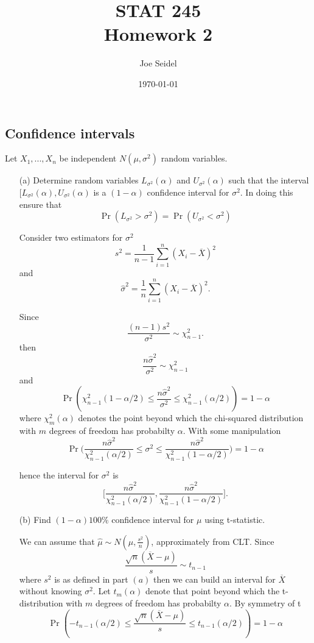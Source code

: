 \documentclass{tufte-book}
\title{STAT  245\\Homework 2}
\author{Joe Seidel}
\date{\today}
\begin{document}
\maketitle
{}
\newpage
{}

\subsection{Confidence intervals}
Let $X_1,...,X_n$ be independent $N(\mu, \sigma^2)$ random variables.

\begin{enumerate}
\item[(a)] Determine random variables $L_{\sigma^2}(\alpha)$ and $U_{\sigma^2}(\alpha)$ such that the interval $[L_{\sigma^2}(\alpha),U_{\sigma^2}(\alpha)$ is a $(1-\alpha)$ confidence interval for $\sigma^2$.  In doing this ensure that
\[ \Pr(L_{\sigma^2}>\sigma^2) = \Pr(U_{\sigma^2} < \sigma^2) \]

Consider two estimators for $\sigma^2$
\[ s^2 = \frac{1}{n-1}\sum_{i=1}^n(X_i-\overline{X})^2 \]
and
\[ \hat{\sigma}^2 = \frac{1}{n}\sum_{i=1}^n(X_i - \overline{X})^2. \]

Since
\[ \frac{(n-1)s^2}{\sigma^2} \sim \chi^2_{n-1}. \]
then
\[ \frac{n\hat{\sigma}^2}{\sigma^2} \sim \chi_{n-1}^2 \]
and
\[ \Pr(\chi_{n-1}^2(1-\alpha/2) \leq \frac{n\hat{\sigma}^2}{\sigma^2} \leq \chi_{n-1}^2(\alpha/2)) = 1-\alpha \]
where $\chi_{m}^2(\alpha)$ denotes the point beyond which the chi-squared distribution with $m$ degrees of freedom has probabilty $\alpha$.  With some manipulation
\[ \Pr\big(\frac{n\hat{\sigma}^2}{\chi_{n-1}^2(\alpha/2)}\leq \sigma^2 \leq \frac{n\hat{\sigma}^2}{\chi_{n-1}^2(1-\alpha/2)}\big) = 1-\alpha \]

hence the interval for $\sigma^2$ is
\[ \big[\frac{n\hat{\sigma}^2}{\chi_{n-1}^2(\alpha/2)},\frac{n\hat{\sigma}^2}{\chi_{n-1}^2(1-\alpha/2)}\Big]. \]

\item[(b)] Find $(1-\alpha)100\%$ confidence interval for $\mu$ using t-statistic.

We can assume that $\hat{\mu} \sim N(\mu, \frac{s^2}{n})$, approximately from CLT.
Since
\[ \frac{\sqrt{n}(\overline{X}-\mu)}{s} \sim t_{n-1} \]
where $s^2$ is as defined in part $(a)$ then we can build an interval for $\overline{X}$ without knowing $\sigma^2$.  Let $t_m(\alpha)$ denote that point beyond which the t-distribution with $m$ degrees of freedom has probabilty $\alpha$. By symmetry of t
\[ \Pr(-t_{n-1}(\alpha/2) \leq \frac{\sqrt{n}(\overline{X}-\mu)}{s} \leq t_{n-1}(\alpha/2) ) = 1-\alpha \]


\end{enumerate}
\end{document}
